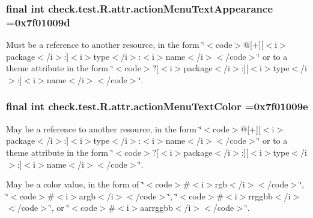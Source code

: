 \subsubsection[{action\+Menu\+Text\+Appearance}]{\setlength{\rightskip}{0pt plus 5cm}final int check.\+test.\+R.\+attr.\+action\+Menu\+Text\+Appearance =0x7f01009d\hspace{0.3cm}{\ttfamily [static]}}\label{classcheck_1_1test_1_1_r_1_1attr_aeb2f5cb8f87508e1e6720da3ab4010aa}
Must be a reference to another resource, in the form \char`\"{}$<$code$>$@\mbox{[}+\mbox{]}\mbox{[}$<$i$>$package$<$/i$>$\+:\mbox{]}$<$i$>$type$<$/i$>$\+:$<$i$>$name$<$/i$>$$<$/code$>$\char`\"{} or to a theme attribute in the form \char`\"{}$<$code$>$?\mbox{[}$<$i$>$package$<$/i$>$\+:\mbox{]}\mbox{[}$<$i$>$type$<$/i$>$\+:\mbox{]}$<$i$>$name$<$/i$>$$<$/code$>$\char`\"{}. \hypertarget{classcheck_1_1test_1_1_r_1_1attr_a52d949c4652ebc1902752ce243b0f3c9}{}
\subsubsection[{action\+Menu\+Text\+Color}]{\setlength{\rightskip}{0pt plus 5cm}final int check.\+test.\+R.\+attr.\+action\+Menu\+Text\+Color =0x7f01009e\hspace{0.3cm}{\ttfamily [static]}}\label{classcheck_1_1test_1_1_r_1_1attr_a52d949c4652ebc1902752ce243b0f3c9}
May be a reference to another resource, in the form \char`\"{}$<$code$>$@\mbox{[}+\mbox{]}\mbox{[}$<$i$>$package$<$/i$>$\+:\mbox{]}$<$i$>$type$<$/i$>$\+:$<$i$>$name$<$/i$>$$<$/code$>$\char`\"{} or to a theme attribute in the form \char`\"{}$<$code$>$?\mbox{[}$<$i$>$package$<$/i$>$\+:\mbox{]}\mbox{[}$<$i$>$type$<$/i$>$\+:\mbox{]}$<$i$>$name$<$/i$>$$<$/code$>$\char`\"{}. 

May be a color value, in the form of \char`\"{}$<$code$>$\#$<$i$>$rgb$<$/i$>$$<$/code$>$\char`\"{}, \char`\"{}$<$code$>$\#$<$i$>$argb$<$/i$>$$<$/code$>$\char`\"{}, \char`\"{}$<$code$>$\#$<$i$>$rrggbb$<$/i$>$$<$/code$>$\char`\"{}, or \char`\"{}$<$code$>$\#$<$i$>$aarrggbb$<$/i$>$$<$/code$>$\char`\"{}. \hypertarget{classcheck_1_1test_1_1_r_1_1attr_a4b63c85a0ab6b03ffd464efc207712d8}{}
